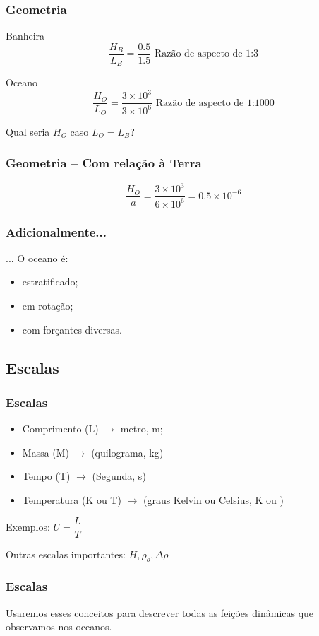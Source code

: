 \begin{frame}
\frametitle{Geometria}
  \begin{block}{Banheira}
  \[
    \dfrac{H_B}{L_B} = \dfrac{0.5}{1.5} \text{ Razão de aspecto de 1:3}
  \]
  \end{block}
\pause
  \begin{block}{Oceano}
  \[
    \dfrac{H_O}{L_O} = \dfrac{3\times10^3}{3\times10^6} \text{ Razão de aspecto de 1:1000}
  \]
  \end{block}
\pause
Qual seria $H_O$ caso $L_O = L_B$?
\end{frame}


\begin{frame}
\frametitle{Geometria -- Com relação à Terra}
  \begin{block}{}
  \[
    \dfrac{H_O}{a} = \dfrac{3\times10^3}{6\times10^6} = 0.5\times10^{-6}
  \]
  \end{block}
\end{frame}


\begin{frame}
\frametitle{Adicionalmente...}
... O oceano é:
  \begin{itemize}[<+-| alert@+>]
    \item estratificado;
    \item em rotação;
    \item com forçantes diversas.
  \end{itemize}
\end{frame}

\subsection{Escalas}
\begin{frame}
\frametitle{Escalas}
  \begin{itemize}[<+-| alert@+>]
    \item Comprimento (L) $\rightarrow$ metro, m;
    \item Massa (M) $\rightarrow$ (quilograma, kg)
    \item Tempo (T) $\rightarrow$ (Segunda, s)
    \item Temperatura (K ou T) $\rightarrow$ (graus Kelvin ou Celsius, K ou )
  \end{itemize}
\pause
Exemplos: $U = \dfrac{L}{T}$
\pause

Outras escalas importantes: $H, \rho_o, \Delta\rho$
\end{frame}

\begin{frame}
\frametitle{Escalas}
  \begin{center}
  \end{center}
\pause
Usaremos esses conceitos para descrever todas as feições dinâmicas que observamos
nos oceanos.
\end{frame}

